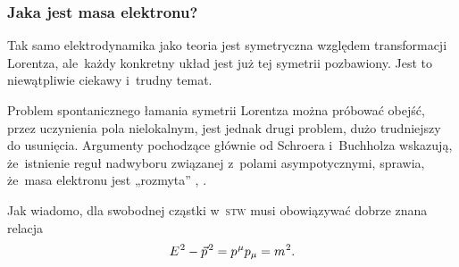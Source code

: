 \documentclass[10pt,t]{beamer}
\begin{document}
\begin{frame}
  \frametitle{Jaka jest masa elektronu?}


  Tak samo elektrodynamika jako teoria jest symetryczna względem
  transformacji Lorentza, ale~każdy konkretny układ jest już tej symetrii
  pozbawiony. Jest to niewątpliwie ciekawy i~trudny temat.

  Problem spontanicznego łamania symetrii Lorentza można próbować obejść,
  przez uczynienia pola nielokalnym, jest jednak drugi problem, dużo
  trudniejszy do usunięcia. Argumenty pochodzące głównie od Schroera
  i~Buchholza wskazują, że~istnienie reguł nadwyboru związanej z~polami
  asympotycznymi, sprawia, że~masa elektronu jest „rozmyta”
  \parencite{Schroer-Infraparticles-in-quantum-field-theory-Pub-1963},
  \parencite{Buchholz-The-Physical-State-Space-Of-Quantum-ETC-Pub-1982}.

  Jak wiadomo, dla swobodnej cząstki w~\textsc{stw} musi obowiązywać
  dobrze znana relacja
  \begin{equation}
    \label{eq:Glowne-rodzaje-problemow-podczerwonych-12}
    E^{ \hspace{0.05em} 2 } - \vec{p}^{ \hspace{0.09em} 2 } =
    p^{ \hspace{0.05em} \mu } p_{ \mu }  = m^{ \hspace{0.05em} 2 }.
  \end{equation}


\end{frame}
\end{document}

